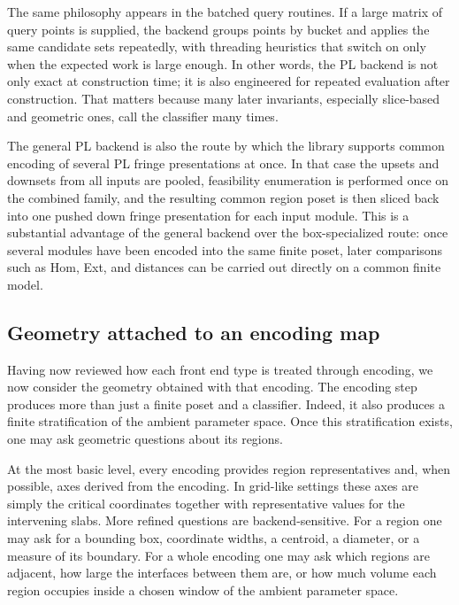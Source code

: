 \documentclass[11pt]{article}
\theoremstyle{definition}
\theoremstyle{remark}
\begin{document}
The same philosophy appears in the batched query routines.  If a large matrix of query points is supplied, the backend groups points by bucket and applies the same candidate sets repeatedly, with threading heuristics that switch on only when the expected work is large enough.  In other words, the PL backend is not only exact at construction time; it is also engineered for repeated evaluation after construction.  That matters because many later invariants, especially slice-based and geometric ones, call the classifier many times.

The general PL backend is also the route by which the library supports common encoding of several PL fringe presentations at once.  In that case the upsets and downsets from all inputs are pooled, feasibility enumeration is performed once on the combined family, and the resulting common region poset is then sliced back into one pushed down fringe presentation for each input module.  This is a substantial advantage of the general backend over the box-specialized route: once several modules have been encoded into the same finite poset, later comparisons such as Hom, Ext, and distances can be carried out directly on a common finite model.  

\subsection{Geometry attached to an encoding map}
\label{subsec:encoding-geometry}

Having now reviewed how each front end type is treated through encoding, we now consider the geometry obtained with that encoding. The encoding step produces more than just a finite poset and a classifier.  Indeed, it also produces a finite stratification of the ambient parameter space.  Once this stratification exists, one may ask geometric questions about its regions.

At the most basic level, every encoding provides region representatives and, when possible, axes derived from the encoding.  In grid-like settings these axes are simply the critical coordinates together with representative values for the intervening slabs.  More refined questions are backend-sensitive.  For a region one may ask for a bounding box, coordinate widths, a centroid, a diameter, or a measure of its boundary.  For a whole encoding one may ask which regions are adjacent, how large the interfaces between them are, or how much volume each region occupies inside a chosen window of the ambient parameter space.
\end{document}
